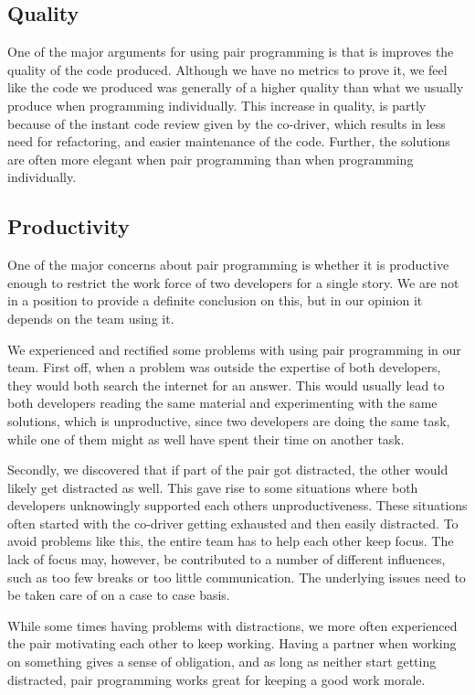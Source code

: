 \subsection{Quality}
One of the major arguments for using pair programming is that is improves the quality of the code produced.
Although we have no metrics to prove it, we feel like the code we produced was generally of a higher quality than what we usually produce when programming individually.
This increase in quality, is partly because of the instant code review given by the co-driver, which results in less need for refactoring, and easier maintenance of the code.
Further, the solutions are often more elegant when pair programming than when programming individually.


\subsection{Productivity}
One of the major concerns about pair programming is whether it is productive enough to restrict the work force of two developers for a single story.
We are not in a position to provide a definite conclusion on this, but in our opinion it depends on the team using it.

We experienced and rectified some problems with using pair programming in our team.
First off, when a problem was outside the expertise of both developers, they would both search the internet for an answer.
This would usually lead to both developers reading the same material and experimenting with the same solutions, which is unproductive, since two developers are doing the same task, while one of them might as well have spent their time on another task.

Secondly, we discovered that if part of the pair got distracted, the other would likely get distracted as well.
This gave rise to some situations where both developers unknowingly supported each others unproductiveness.
These situations often started with the co-driver getting exhausted and then easily distracted.
To avoid problems like this, the entire team has to help each other keep focus.
The lack of focus may, however, be contributed to a number of different influences, such as too few breaks or too little communication.
The underlying issues need to be taken care of on a case to case basis.

While some times having problems with distractions, we more often experienced the pair motivating each other to keep working.
Having a partner when working on something gives a sense of obligation, and as long as neither start getting distracted, pair programming works great for keeping a good work morale.

